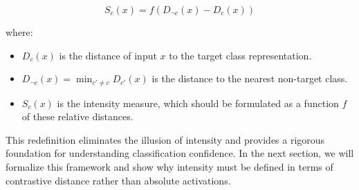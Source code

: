 \[
S_c(x) = f(D_{\neg c}(x) - D_c(x))
\]

where:

\begin{itemize}
    \item \( D_c(x) \) is the distance of input \( x \) to the target class representation.
    \item \( D_{\neg c}(x) = \min_{c' \neq c} D_{c'}(x) \) is the distance to the nearest non-target class.
    \item \( S_c(x) \) is the intensity measure, which should be formulated as a function \( f \) of these relative distances.
\end{itemize}

This redefinition eliminates the illusion of intensity and provides a rigorous foundation for understanding classification confidence. In the next section, we will formalize this framework and show why intensity must be defined in terms of contrastive distance rather than absolute activations.

